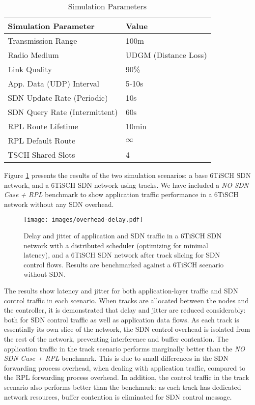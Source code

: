 \begin{table}[ht]
	\renewcommand{\arraystretch}{1.0}
	\caption{Simulation Parameters}
    \label{table:results_params}
	\centering
    \begin{tabular}{ |l|l| }
    \hline
      	\bfseries Simulation Parameter & \bfseries Value \\ \hline
        Transmission Range & 100m \\ \hline
        Radio Medium & UDGM (Distance Loss) \\ \hline
        Link Quality & 90\% \\ \hline
        App. Data (UDP) Interval & 5-10s \\ \hline
        SDN Update Rate (Periodic) & 10s \\ \hline
        SDN Query Rate (Intermittent) & 60s \\ \hline
        RPL Route Lifetime & 10min \\ \hline
        RPL Default Route & $\infty$ \\ \hline
        TSCH Shared Slots & 4 \\ 
    \hline
    \end{tabular}
\end{table}

Figure \ref{fig:overhead_delay} presents the results of the two simulation scenarios: a base 6TiSCH SDN network, and a 6TiSCH SDN network using tracks. We have included a \textit{NO SDN Case + RPL} benchmark to show application traffic performance in a 6TiSCH network without any SDN overhead. 

\begin{figure}[ht]
\centering
  \texttt{[image: images/overhead-delay.pdf]}
  \caption{Delay and jitter of application and SDN traffic in a 6TiSCH SDN network with a distributed scheduler (optimizing for minimal latency), and a 6TiSCH SDN network after track slicing for SDN control flows. Results are benchmarked against a 6TiSCH scenario without SDN.}
  \label{fig:overhead_delay}
\end{figure}

The results show latency and jitter for both application-layer traffic and SDN control traffic in each scenario. When tracks are allocated between the nodes and the controller, it is demonstrated that delay and jitter are reduced considerably: both for SDN control traffic as well as application data flows. As each track is essentially its own slice of the network, the SDN control overhead is isolated from the rest of the network, preventing interference and buffer contention. The application traffic in the track scenario performs marginally better than the \textit{NO SDN Case + RPL} benchmark. This is due to small differences in the SDN forwarding process overhead, when dealing with application traffic, compared to the RPL forwarding process overhead. In addition, the control traffic in the track scenario also performs better than the benchmark: as each track has dedicated network resources, buffer contention is eliminated for SDN control message.


